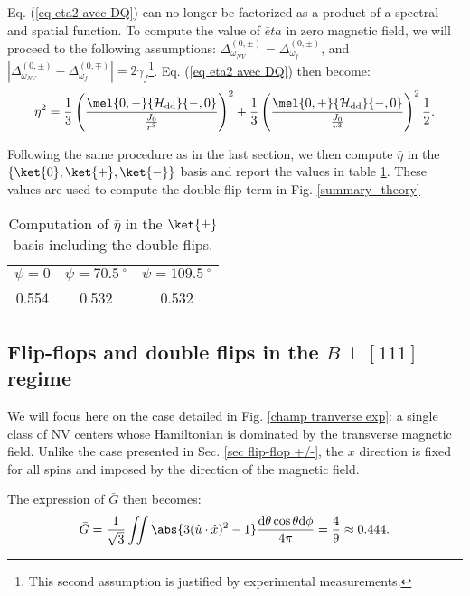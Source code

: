\documentclass[a4paper, 11pt]{report}
\begin{document}
Eq. (\ref{eq eta2 avec DQ}) can no longer be factorized as a product of a spectral and spatial function. To compute the value of $\bar eta$ in zero magnetic field, we will proceed to the following assumptions: $\Delta_{\omega_{NV}}^{(0,\pm)}=\Delta_{\omega_{f}}^{(0,\pm)}$, and $|\Delta_{\omega_{NV}}^{(0,\pm)}-\Delta_{\omega_{f}}^{(0,\mp)}|=2 \gamma_f$\footnote{This second assumption is justified by experimental measurements.}. Eq. (\ref{eq eta2 avec DQ}) then become:
\begin{equation}
\eta^2=\frac{1}{3} \left(\frac{\mel{0,-}{\mathcal{H_{\rm dd}}}{-,0}}{\frac{J_0}{r^3}}\right)^2 
+\frac{1}{3} \left(\frac{\mel{0,+}{\mathcal{H_{\rm dd}}}{-,0}}{\frac{J_0}{r^3}}\right)^2 \frac{1}{2}.
\end{equation}

Following the same procedure as in the last section, we then compute $\bar \eta$ in the $\{ \ket{0}, \ket{+}, \ket{-}\}$ basis and report the values in table \ref{table eta double flip non mag}. These values are used to compute the double-flip term in Fig. \ref{summary_theory}

\begin{table}[htbp]
\centering
\caption{Computation of $\bar \eta$ in the $\ket{\pm}$ basis including the double flips.}
 \label{table eta double flip non mag}
\begin{tabular}{c|c|c}
\toprule
$\psi=0$ & $\psi=70.5 \ ^\circ$ & $\psi=109.5 \ ^\circ$ \\

0.554 & 0.532 & 0.532 \\
\bottomrule
\end{tabular}
\end{table}

\subsection{Flip-flops and double flips in the $B\perp [111]$ regime}

We will focus here on the case detailed in Fig. \ref{champ tranverse exp}: a single class of NV centers whose Hamiltonian is dominated by the transverse magnetic field. Unlike the case presented in Sec. \ref{sec flip-flop +/-}, the $x$ direction is fixed for all spins and imposed by the direction of the magnetic field.

The expression of $\bar G$ then becomes:
\begin{equation}
\bar{G}= \frac{1}{\sqrt{3}}\iint \abs{3(\hat{u}\cdot\hat{x})^2 - 1} \frac{\rm d\theta \cos \theta \rm d\phi}{4 \pi}= \frac{4}{9}\approx 0.444.
\end{equation}
\end{document}
